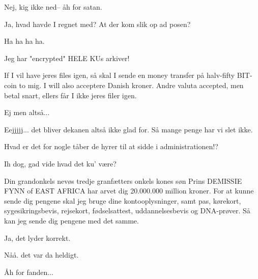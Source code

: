 \documentclass[a4paper,11pt]{article}
\begin{document}
\begin{sketch}
 Nej, kig ikke ned-- åh for satan.


 Ja, hvad havde I regnet med?  At der kom slik op ad posen?


 Ha ha ha ha.


 Jeg har  "encrypted" HELE KUs arkiver!

 If I vil have jeres files igen, så skal I sende en money transfer på halv-fifty BIT-coin to mig.  I will also acceptere Danish kroner.  Andre valuta accepted, men betal snart, ellers får I ikke jeres filer igen.


 Ej men altså...

 Eejjjjj... det bliver dekanen altså ikke glad for.
 Så mange penge har vi slet ikke.

 Hvad er det for nogle tåber de hyrer til at sidde i administrationen!?


 Ih dog, gad vide hvad det ku' være?


 Din grandonkels nevøs tredje granfætters onkels kones søn Prins DEMISSIE FYNN of EAST AFRICA har arvet dig 20.000.000 million kroner.  For at kunne sende dig pengene skal jeg bruge dine kontooplysninger, samt pas, kørekort, sygesikringsbevis, rejsekort, fødselsattest, uddannelsesbevis og DNA-prøver.  Så kan jeg sende dig pengene med det samme. 

 Ja, det lyder korrekt.  

 Nåå. det var da heldigt.

 Åh for fanden...



\end{sketch}
\end{document}
